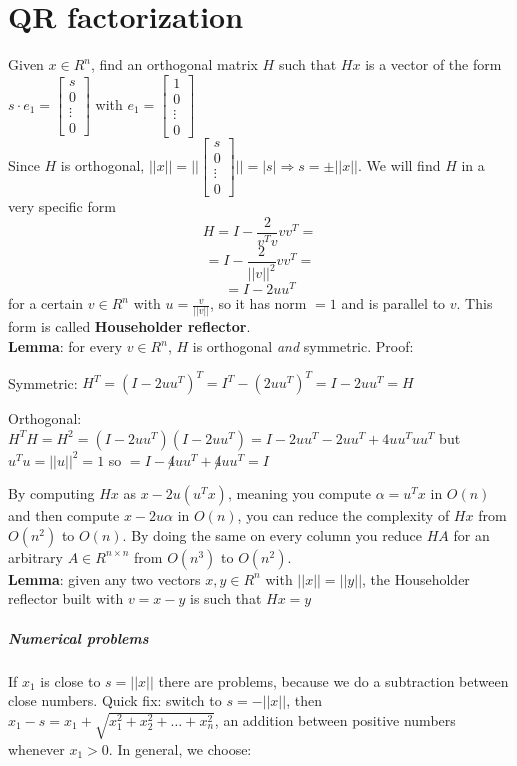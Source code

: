 \documentclass[10pt]{report}
\begin{document}
\section{QR factorization} Given $x\in R^n$, find an orthogonal matrix $H$ such that $Hx$ is a vector of the form $s\cdot e_1 = \left[\begin{array}{c}
s\\0\\\vdots\\0
\end{array}\right]$ with $e_1 = \left[\begin{array}{c}
1\\0\\\vdots\\0
\end{array}\right]$\\
Since $H$ is orthogonal, $||x|| = ||\left[\begin{array}{c}
s\\0\\\vdots\\0
\end{array}\right]|| = |s| \Rightarrow s = \pm||x||$. We will find $H$ in a very specific form $$H = I - \frac{2}{v^Tv}vv^T=$$ $$= I - \frac{2}{||v||^2}vv^T =$$ $$= I - 2uu^T$$ for a certain $v\in R^n$ with $u = \frac{v}{||v||}$, so it has norm $=1$ and is parallel to $v$. This form is called \textbf{Householder reflector}.\\
\textbf{Lemma}: for every $v\in R^n$, $H$ is orthogonal \textit{and} symmetric. Proof:
\begin{list}{}{}
	\item Symmetric: $H^T = (I-2uu^T)^T = I^T - (2uu^T)^T = I - 2uu^T = H$
	\item Orthogonal: $H^TH = H^2 = (I-2uu^T)(I-2uu^T) = I - 2uu^T - 2uu^T + 4uu^Tuu^T$ but $u^Tu = ||u||^2 = 1$ so $= I - \not 4uu^T + \not 4uu^T = I$
\end{list}
By computing $Hx$ as $x - 2u(u^T x)$, meaning you compute $\alpha = u^Tx$ in $O(n)$ and then compute $x-2u\alpha$ in $O(n)$, you can reduce the complexity of $Hx$ from $O(n^2)$ to $O(n)$. By doing the same on every column you reduce $HA$ for an arbitrary $A\in R^{n\times n}$ from $O(n^3)$ to $O(n^2)$.\\
\textbf{Lemma}: given any two vectors $x,y\in R^n$ with $||x|| = ||y||$, the Householder reflector built with $v = x-y$ is such that $Hx = y$
\subparagraph{Numerical problems} If $x_1$ is close to $s = ||x||$ there are problems, because we do a subtraction between close numbers. Quick fix: switch to $s = -||x||$, then $x_1 - s = x_1 + \sqrt{x_1^2+x_2^2+\ldots+x_n^2}$, an addition between positive numbers whenever $x_1 > 0$. In general, we choose:
\end{document}

